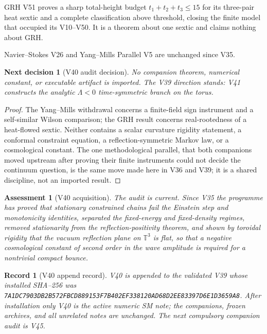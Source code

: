 \documentclass[11pt]{article}
\newtheorem{decision}[theorem]{Next decision}
\newtheorem{assessment}[theorem]{Assessment}
\newtheorem{record}[theorem]{Record}
\theoremstyle{remark}
\begin{document}
GRH V51 proves a sharp total-height budget \(t_1+t_2+t_3\leq15\) for
its three-pair heat sextic and a complete classification above
threshold, closing the finite model that occupied its V10--V50.  It is a
theorem about one sextic and claims nothing about GRH.

Navier--Stokes V26 and Yang--Mills Parallel V5 are unchanged since V35.

\begin{decision}[V40 audit decision]
\label{dec:v19v40-audit}
No companion theorem, numerical constant, or executable artifact is
imported.  The V39 direction stands: V41 constructs the analytic
\(\Lambda<0\) time-symmetric branch on the torus.
\end{decision}

\begin{proof}
The Yang--Mills withdrawal concerns a finite-field sign instrument
and a self-similar Wilson comparison; the GRH result concerns
real-rootedness of a heat-flowed sextic.  Neither contains a scalar
curvature rigidity statement, a conformal constraint equation, a
reflection-symmetric Markov law, or a cosmological constant.  The one
methodological parallel, that both companions moved upstream after
proving their finite instruments could not decide the continuum
question, is the same move made here in V36 and V39; it is a shared
discipline, not an imported result.
\end{proof}

\begin{assessment}[V40 acquisition]
\label{ass:v19v40}
The audit is current.  Since V35 the programme has proved that
stationary constrained chains fail the Einstein step and monotonicity
identities, separated the fixed-energy and fixed-density regimes,
removed stationarity from the reflection-positivity theorem, and shown
by toroidal rigidity that the vacuum reflection plane on
\(\mathbb T^3\) is flat, so that a negative cosmological constant of
second order in the wave amplitude is required for a nontrivial
compact bounce.
\end{assessment}

\begin{record}[V40 append record]
\label{rec:v19v40}
V40 is appended to the validated V39 whose installed SHA--256 was
\texttt{7A1DC7903DB2B572FBCD889153F7B402EF338120AD68D2EE83397D6E1D3659A8}.
After installation only V40 is the active numeric SM note; the
companions, frozen archives, and all unrelated notes are unchanged.  The
next compulsory companion audit is V45.
\end{record}
\end{document}
